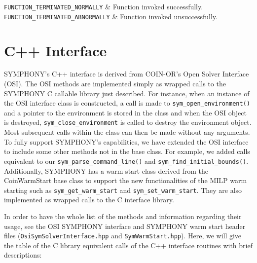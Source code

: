 \returns

{\tt FUNCTION\_TERMINATED\_NORMALLY} & Function invoked successfully.\\
{\tt FUNCTION\_TERMINATED\_ABNORMALLY} & Function invoked unsuccessfully.\\
\et  
\ed
\vspace{1ex}

\ed

\newpage

\section{C++ Interface}
\label{C++_Interface}

SYMPHONY's C++ interface is derived from COIN-OR's Open Solver Interface
(OSI). The OSI methods are implemented simply as wrapped calls to the SYMPHONY
C callable library just described. For instance, when an instance of the OSI
interface class is constructed, a call is made to
\texttt{sym\_open\_environment()} and a pointer to the environment is stored
in the class and when the OSI object is destroyed,
\texttt{sym\_close\_environment} is called to destroy the environment object. 
Most subsequent calls within the class can then be made without
any arguments. To fully support SYMPHONY's capabilities, we have 
extended the OSI interface to include some other methods not in the base 
class. For example, we added calls equivalent to our 
\texttt{sym\_parse\_command\_line()} and \texttt{sym\_find\_initial\_bounds()}.
Additionally, SYMPHONY has a warm start class derived from the CoinWarmStart 
base class to support the new functionalities of the MILP warm starting such 
as \texttt{sym\_get\_warm\_start} and \texttt{sym\_set\_warm\_start}. They are 
also implemented as wrapped calls to the C interface library. 

In order to have the whole list of the methods and information 
regarding their usage, see the OSI SYMPHONY interface and SYMPHONY warm start
header files (\texttt{OsiSymSolverInterface.hpp} and 
\texttt{SymWarmStart.hpp}). Here, we will give the table of the C library 
equivalent calls of the C++ interface routines with brief descriptions:

\newpage


